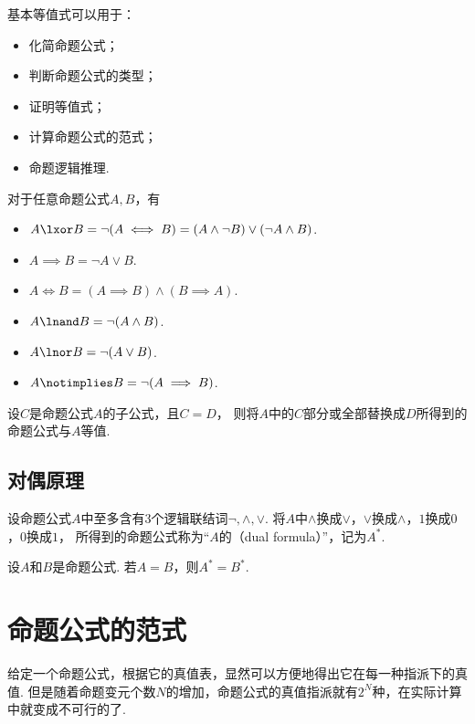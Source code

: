 \begin{remark}
基本等值式可以用于：\begin{itemize}
	\item 化简命题公式；
	\item 判断命题公式的类型；
	\item 证明等值式；
	\item 计算命题公式的范式；
	\item 命题逻辑推理.
\end{itemize}
\end{remark}

对于任意命题公式\(A,B\)，有\begin{itemize}
	\item \(A \lxor B
	= \neg(A \iff B)
	= (A \land \neg B) \lor (\neg A \land B)\).
	\item \(A \implies B
	= \neg A \lor B\).
	\item \(A \iff B
	= (A \implies B) \land (B \implies A)\).
	\item \(A \lnand B
	= \neg(A \land B)\).
	\item \(A \lnor B
	= \neg(A \lor B)\).
	\item \(A \notimplies B
	= \neg(A \implies B)\).
\end{itemize}

\begin{theorem}[等值置换定理]
设\(C\)是命题公式\(A\)的子公式，且\(C = D\)，
则将\(A\)中的\(C\)部分或全部替换成\(D\)所得到的命题公式与\(A\)等值.
\end{theorem}

\subsection{对偶原理}
\begin{definition}
设命题公式\(A\)中至多含有3个逻辑联结词\(\neg,\land,\lor\).
将\(A\)中\(\land\)换成\(\lor\)，\(\lor\)换成\(\land\)，\(1\)换成\(0\)，\(0\)换成\(1\)，
所得到的命题公式称为“\(A\)的（dual formula）”，记为\(A^*\).
\end{definition}

\begin{theorem}[对偶原理]
设\(A\)和\(B\)是命题公式.
若\(A = B\)，则\(A^* = B^*\).
\end{theorem}

\section{命题公式的范式}
给定一个命题公式，根据它的真值表，显然可以方便地得出它在每一种指派下的真值.
但是随着命题变元个数\(N\)的增加，命题公式的真值指派就有\(2^N\)种，在实际计算中就变成不可行的了.

